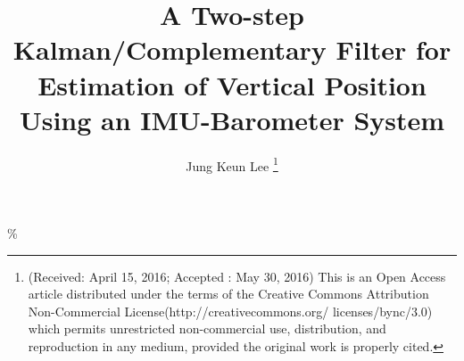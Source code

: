 \documentclass[10pt,journal,compsoc]{IEEEtran}
\begin{document}
\title{A Two-step Kalman/Complementary Filter for Estimation of Vertical Position
Using an IMU-Barometer System}

\author{Jung Keun Lee
\thanks{(Received: April 15, 2016; Accepted : May 30, 2016)
This is an Open Access article distributed under the terms of the Creative
Commons Attribution Non-Commercial License(http://creativecommons.org/
licenses/bync/3.0) which permits unrestricted non-commercial use, distribution,
and reproduction in any medium, provided the original work is properly cited.}}

% 
%



\%
% 
\end{document}
